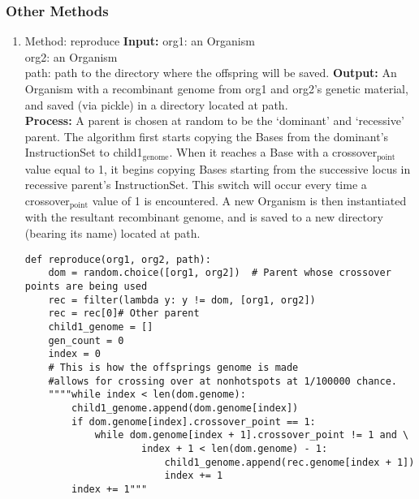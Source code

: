 \documentclass[a4paper]{article}
\begin{document}
\subsubsection{Other Methods}
\label{sec-7-3-2}
\begin{enumerate}
\item Method: reproduce
\label{sec-7-3-2-1}
\textbf{Input:} org1: an Organism\\
org2: an Organism\\
path: path to the directory where the offspring will be saved.
\textbf{Output:} An Organism with a recombinant  genome from org1 and org2’s genetic material, and 
saved (via pickle) in a directory located at path.\\
\textbf{Process:} A parent is chosen at random to be the ‘dominant’ and ‘recessive’ parent. 
The algorithm first starts copying the Bases from the dominant’s InstructionSet to child1$_{\text{genome}}$.
 When it reaches a Base with a crossover$_{\text{point}}$ value equal to 1, it begins copying Bases starting 
from the successive locus in recessive parent’s InstructionSet. This switch will occur every time a
 crossover$_{\text{point}}$ value of 1 is encountered. A new Organism is then instantiated with the resultant
 recombinant genome, and is saved to a new directory (bearing its name) located at path.\\

\begin{verbatim}
def reproduce(org1, org2, path):
    dom = random.choice([org1, org2])  # Parent whose crossover points are being used
    rec = filter(lambda y: y != dom, [org1, org2])
    rec = rec[0]# Other parent
    child1_genome = []
    gen_count = 0
    index = 0
    # This is how the offsprings genome is made
    #allows for crossing over at nonhotspots at 1/100000 chance.
    """"while index < len(dom.genome):
        child1_genome.append(dom.genome[index])
        if dom.genome[index].crossover_point == 1:
            while dom.genome[index + 1].crossover_point != 1 and \
                    index + 1 < len(dom.genome) - 1:
                        child1_genome.append(rec.genome[index + 1])
                        index += 1
        index += 1"""


\end{verbatim}
\end{enumerate}
\end{document}
